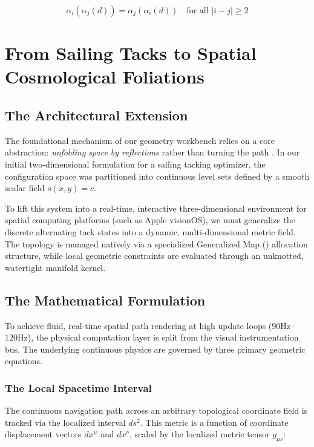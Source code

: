 \[
\alpha_i(\alpha_j(d)) = \alpha_j(\alpha_i(d)) \quad \text{for all } |i - j| \geq 2
\]



\chapter{From Sailing Tacks to Spatial Cosmological Foliations}
\label{ch:sailing_to_cosmology}

\section{The Architectural Extension}
The foundational mechanism of our geometry workbench relies on a core abstraction: \textit{unfolding space by reflections} rather than turning the path \cite{damiand2014}. In our initial two-dimensional formulation for a sailing tacking optimizer, the configuration space was partitioned into continuous level sets defined by a smooth scalar field $s(x,y) = c$. 

To lift this system into a real-time, interactive three-dimensional environment for spatial computing platforms (such as Apple visionOS), we must generalize the discrete alternating tack states into a dynamic, multi-dimensional metric field. The topology is managed natively via a specialized Generalized Map (\GMap) allocation structure, while local geometric constraints are evaluated through an unknotted, watertight manifold kernel.

\section{The Mathematical Formulation}

To achieve fluid, real-time spatial path rendering at high update loops ($90\text{Hz}$--$120\text{Hz}$), the physical computation layer is split from the visual instrumentation bus. The underlying continuous physics are governed by three primary geometric equations.

\subsection{The Local Spacetime Interval}
The continuous navigation path across an arbitrary topological coordinate field is tracked via the localized interval $ds^2$. This metric is a function of coordinate displacement vectors $dx^\mu$ and $dx^\nu$, scaled by the localized metric tensor $g_{\mu\nu}$:

